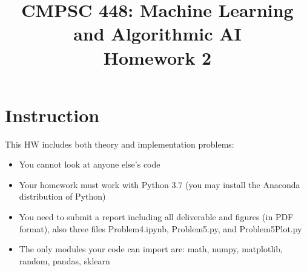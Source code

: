 \documentclass[11pt]{article}
\title{CMPSC 448: Machine Learning and Algorithmic AI \\ Homework 2}
\author{}
\date{}
\theoremstyle{quest}
\begin{document}
\maketitle

\section*{Instruction}

This HW includes both theory and implementation problems:
\begin{itemize}
    \item You cannot look at anyone else's code
    \item Your homework must work with Python 3.7 (you may install the Anaconda distribution of Python)
    \item You need to submit a report including all deliverable and figures (in PDF format), also three files \textsf{Problem4.ipynb}, \textsf{Problem5.py}, and \textsf{Problem5Plot.py}
    \item The only modules your code can import are: \textsf{math}, \textsf{numpy}, \textsf{matplotlib}, \textsf{random}, \textsf{pandas}, \textsf{sklearn}
\end{itemize}
\end{document}
